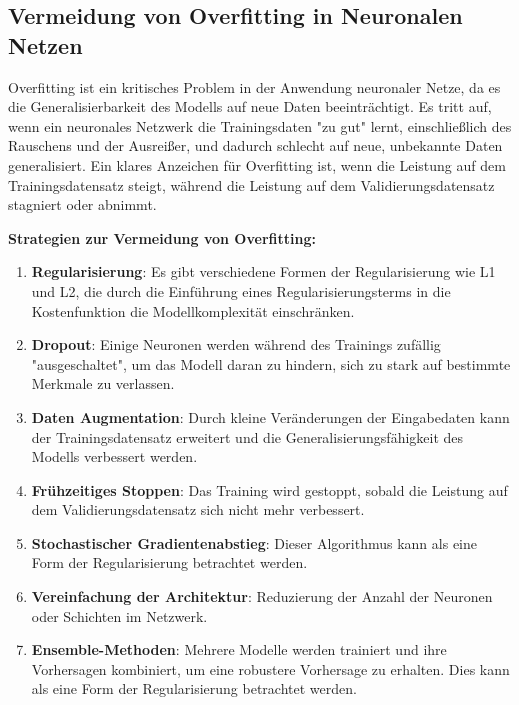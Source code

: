 \subsection{Vermeidung von Overfitting in Neuronalen Netzen}
\label{sec: overfitting}

Overfitting ist ein kritisches Problem in der Anwendung neuronaler Netze, da es die Generalisierbarkeit des Modells auf neue Daten beeinträchtigt. 
Es tritt auf, wenn ein neuronales Netzwerk die Trainingsdaten "zu gut" lernt, einschließlich des Rauschens und der Ausreißer, und dadurch schlecht auf neue, unbekannte Daten generalisiert. 
Ein klares Anzeichen für Overfitting ist, wenn die Leistung auf dem Trainingsdatensatz steigt, während die Leistung auf dem Validierungsdatensatz stagniert oder abnimmt.
\cite{klein_abbeel_cs188}

\textbf{Strategien zur Vermeidung von Overfitting:}

\begin{enumerate}
    \item \textbf{Regularisierung}: Es gibt verschiedene Formen der Regularisierung wie L1 und L2, die durch die Einführung eines Regularisierungsterms in die Kostenfunktion die Modellkomplexität einschränken.
    \item \textbf{Dropout}: Einige Neuronen werden während des Trainings zufällig "ausgeschaltet", um das Modell daran zu hindern, sich zu stark auf bestimmte Merkmale zu verlassen.
    \item \textbf{Daten Augmentation}: Durch kleine Veränderungen der Eingabedaten kann der Trainingsdatensatz erweitert und die Generalisierungsfähigkeit des Modells verbessert werden.
    \item \textbf{Frühzeitiges Stoppen}: Das Training wird gestoppt, sobald die Leistung auf dem Validierungsdatensatz sich nicht mehr verbessert.
    \item \textbf{Stochastischer Gradientenabstieg}: Dieser Algorithmus kann als eine Form der Regularisierung betrachtet werden.
    \item \textbf{Vereinfachung der Architektur}: Reduzierung der Anzahl der Neuronen oder Schichten im Netzwerk.
    \item \textbf{Ensemble-Methoden}: Mehrere Modelle werden trainiert und ihre Vorhersagen kombiniert, um eine robustere Vorhersage zu erhalten. Dies kann als eine Form der Regularisierung betrachtet werden.
\end{enumerate}




